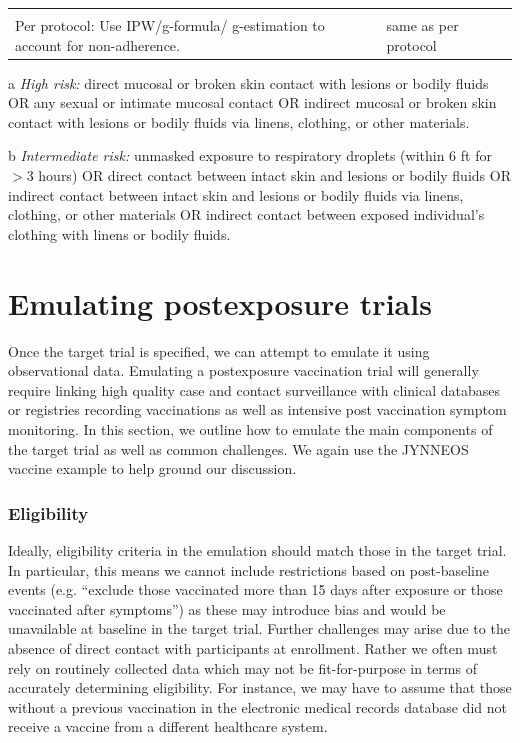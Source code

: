 \documentclass[11pt]{article}
\begin{document}
\begin{table}[p]
\begin{threeparttable}
\begin{tabular}{>{\raggedright\arraybackslash}p{2.5cm}>{\raggedright\arraybackslash}p{7.75cm}>{\raggedright\arraybackslash}p{5cm}}
{        \\ Per protocol: Use IPW/g-formula/ g-estimation to account for non-adherence.} &  same as per protocol  \\
        \bottomrule
    \end{tabular}
    \begin{tablenotes}
        \item[a] \textit{High risk:} direct mucosal or broken skin contact with lesions or bodily fluids OR any sexual or intimate mucosal contact OR indirect mucosal or broken skin contact with lesions or bodily fluids via linens, clothing, or other materials.
        \item[b] \textit{Intermediate risk:} unmasked exposure to respiratory droplets (within 6 ft for $>$3 hours) OR direct contact between intact skin and lesions or bodily fluids OR indirect contact between intact skin and lesions or bodily fluids via linens, clothing, or other materials OR indirect contact between exposed individual's clothing with linens or bodily fluids.
    \end{tablenotes}
\end{threeparttable}
\end{table}

\section{Emulating postexposure trials}
Once the target trial is specified, we can attempt to emulate it using observational data. Emulating a postexposure vaccination trial will generally require linking high quality case and contact surveillance with clinical databases or registries recording vaccinations as well as intensive post vaccination symptom monitoring. In this section, we outline how to emulate the main components of the target trial as well as common challenges. We again use the JYNNEOS vaccine example to help ground our discussion.

\subsubsection*{Eligibility}
Ideally, eligibility criteria in the emulation should match those in the target trial. In particular, this means we cannot include restrictions based on post-baseline events (e.g. ``exclude those vaccinated more than 15 days after exposure or those vaccinated after symptoms'') as these may introduce bias and would be unavailable at baseline in the target trial. Further challenges may arise due to the absence of direct contact with participants at enrollment. Rather we often must rely on routinely collected data which may not be fit-for-purpose in terms of accurately determining eligibility. For instance, we may have to assume that those without a previous vaccination in the electronic medical records database did not receive a vaccine from a different healthcare system.
\end{document}

